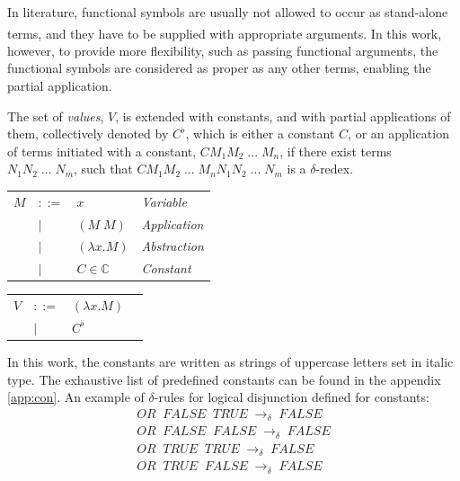 \documentclass[table, a4paper, 10pt]{article}
\newcommand{\cit}[1]{\textsuperscript{\cite{#1}}}
\begin{document}
In literature, functional symbols are usually not allowed to occur
as stand-alone terms, and they have to be supplied with appropriate arguments.\cit{pierce}
In this work, however, to provide more flexibility, such as
passing functional arguments, the functional symbols are
considered as proper as any other terms, enabling the partial application.

The set of \textit{values}, $V$, is extended with constants, and with partial applications
of them, collectively denoted by $C^\flat$, which is either a constant $C$, or an application of terms initiated
with a constant, $C M_1 M_2\;...\;M_n$, if there exist terms $N_1 N_2\;...\;N_m$, such that
$C M_1 M_2\;...\;M_n N_1 N_2\;...\;N_m$ is a $\delta$-redex.

\vspace{3mm}
\begin{tabular}{llll}
$M$ &$::=$             &$x$                 & {\small\hspace{0.2cm}\textit{Variable}}\\
    &\hspace{0.1cm}$|$ &$(M\;M)$            & {\small\hspace{0.2cm}\textit{Application}}\\
    &\hspace{0.1cm}$|$ &$(\lambda x.M)$     & {\small\hspace{0.2cm}\textit{Abstraction}}\\
    &\hspace{0.1cm}$|$ &$C \in \mathbb{C}$  & {\small\hspace{0.2cm}\textit{Constant}}\\
\end{tabular}
\begin{tabular}{llll}
\hspace{11mm}$V$ &$::=$             &$(\lambda x.M)$     &\\
\hspace{11mm}    &\hspace{0.1cm}$|$ &$C^\flat$   &
\hspace{11mm}	\vspace{8.4mm}
\end{tabular}
\vspace{3mm}

\noindent
In this work, the constants are written as strings of uppercase letters set in italic type.
The exhaustive list of predefined constants can be found in the appendix \ref{app:con}.
An example of $\delta$-rules for logical disjunction defined for constants:
\begin{align*}
\mathit{OR}\;\;\mathit{FALSE}\;\;\mathit{TRUE}\;\to_\delta\;\mathit{FALSE}\\
\mathit{OR}\;\;\mathit{FALSE}\;\;\mathit{FALSE}\;\to_\delta\;\mathit{FALSE}\\
\mathit{OR}\;\;\mathit{TRUE}\;\;\mathit{TRUE}\;\to_\delta\;\mathit{FALSE}\\
\mathit{OR}\;\;\mathit{TRUE}\;\;\mathit{FALSE}\;\to_\delta\;\mathit{FALSE}
\end{align*}
\end{document}
